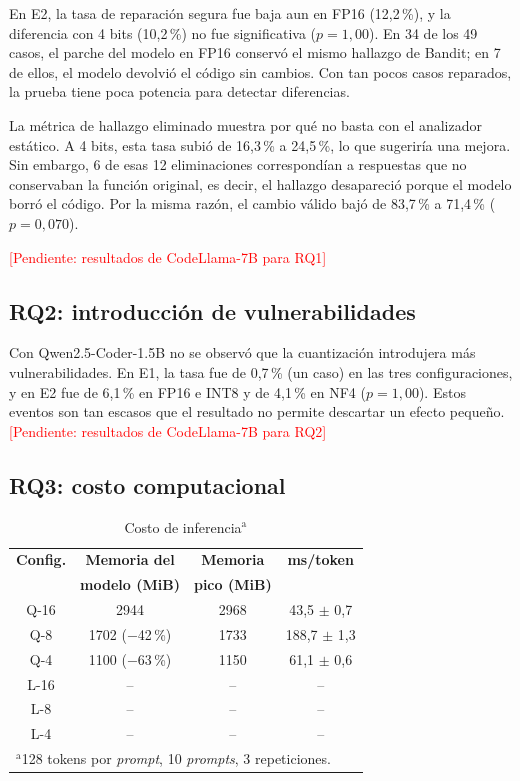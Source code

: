 \documentclass[conference]{IEEEtran}
\newcommand{\pend}[1]{\textcolor{red}{[Pendiente: #1]}}
\begin{document}
En E2, la tasa de reparación segura fue baja aun en FP16 (12,2\,\%), y la diferencia con 4 bits (10,2\,\%) no fue significativa ($p = 1{,}00$). En 34 de los 49 casos, el parche del modelo en FP16 conservó el mismo hallazgo de Bandit; en 7 de ellos, el modelo devolvió el código sin cambios. Con tan pocos casos reparados, la prueba tiene poca potencia para detectar diferencias.

La métrica de hallazgo eliminado muestra por qué no basta con el analizador estático. A 4 bits, esta tasa subió de 16,3\,\% a 24,5\,\%, lo que sugeriría una mejora. Sin embargo, 6 de esas 12 eliminaciones correspondían a respuestas que no conservaban la función original, es decir, el hallazgo desapareció porque el modelo borró el código. Por la misma razón, el cambio válido bajó de 83,7\,\% a 71,4\,\% ($p = 0{,}070$).

\pend{resultados de CodeLlama-7B para RQ1}

\subsection{RQ2: introducción de vulnerabilidades}

Con Qwen2.5-Coder-1.5B no se observó que la cuantización introdujera más vulnerabilidades. En E1, la tasa fue de 0,7\,\% (un caso) en las tres configuraciones, y en E2 fue de 6,1\,\% en FP16 e INT8 y de 4,1\,\% en NF4 ($p = 1{,}00$). Estos eventos son tan escasos que el resultado no permite descartar un efecto pequeño. \pend{resultados de CodeLlama-7B para RQ2}

\subsection{RQ3: costo computacional}

\begin{table}[htbp]
\caption{Costo de inferencia$^{\mathrm{a}}$}
\begin{center}
\begin{tabular}{|c|c|c|c|}
\hline
\textbf{Config.} & \textbf{Memoria del} & \textbf{Memoria} & \textbf{ms/token} \\
 & \textbf{modelo (MiB)} & \textbf{pico (MiB)} & \\
\hline
Q-16 & 2944 & 2968 & 43,5 $\pm$ 0,7 \\
Q-8  & 1702 ($-$42\,\%) & 1733 & 188,7 $\pm$ 1,3 \\
Q-4  & 1100 ($-$63\,\%) & 1150 & 61,1 $\pm$ 0,6 \\
\hline
L-16 & -- & -- & -- \\
L-8  & -- & -- & -- \\
L-4  & -- & -- & -- \\
\hline
\multicolumn{4}{l}{$^{\mathrm{a}}$128 tokens por \emph{prompt}, 10 \emph{prompts}, 3 repeticiones.}
\end{tabular}
\label{tab:costo}
\end{center}
\end{table}
\end{document}
